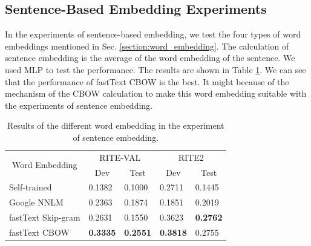 \documentclass[12pt]{article}
\begin{document}
\begin{CJK*}{UTF8}{bkai}
\begin{spacing}{1.77}

\subsection{Sentence-Based Embedding Experiments}
In the experiments of sentence-based embedding, we test the four types of word embeddings mentioned in Sec. \ref{section:word_embedding}. The calculation of sentence embedding is the average of the word embedding of the sentence. We used MLP to test the performance. The results are shown in Table \ref{result:sent_emb_nnlm}. We can see that the performance of fastText CBOW is the best. It might because of the mechanism of the CBOW calculation to make this word embedding suitable with the experiments of sentence embedding.

\begin{table}[H]
  \centering
  \setlength{\extrarowheight}{-3pt}
  \caption{Results of the different word embedding in the experiment of sentence embedding.}
  \label{result:sent_emb_nnlm}
  \begin{tabular}{|l|l|l|l|l|}
  \hline
  \multicolumn{1}{|c|}{\multirow{2}{*}{Word   Embedding}} & \multicolumn{2}{c|}{RITE-VAL} & \multicolumn{2}{c|}{RITE2} \\ \cline{2-5}
  \multicolumn{1}{|c|}{} & \multicolumn{1}{c|}{Dev} & \multicolumn{1}{c|}{Test} & \multicolumn{1}{c|}{Dev} & \multicolumn{1}{c|}{Test} \\ \hline
  Self-trained & 0.1382 & 0.1000 & 0.2711 & 0.1445 \\ \hline
  Google NNLM & 0.2363 & 0.1874 & 0.1851 & 0.2019 \\ \hline
  fastText Skip-gram & 0.2631 & 0.1550 & 0.3623 & \textbf{0.2762} \\ \hline
  fastText CBOW & \textbf{0.3335} & \textbf{0.2551} & \textbf{0.3818} & 0.2755 \\ \hline
  \end{tabular}
\end{table}


\end{spacing}
\end{CJK*}
\end{document}
